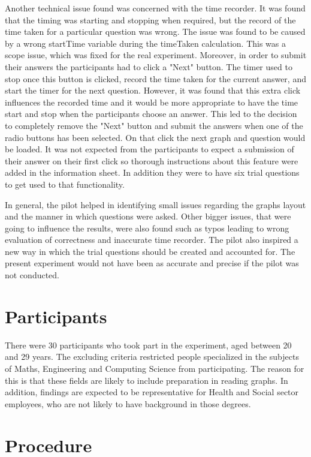 \documentclass{l4proj}
\begin{document}
Another technical issue found was concerned with the time recorder. It was found that the timing was starting and stopping when required, but the record of the time taken for a particular question was wrong. The issue was found to be caused by a wrong startTime variable during the timeTaken calculation. This was a scope issue, which was fixed for the real experiment. Moreover, in order to submit their answers the participants had to click a "Next" button. The timer used to stop once this button is clicked, record the time taken for the current answer, and start the timer for the next question. However, it was found that this extra click influences the recorded time and it would be more appropriate to have the time start and stop when the participants choose an answer. This led to the decision to completely remove the "Next" button and submit the answers when one of the radio buttons has been selected. On that click the next graph and question would be loaded. It was not expected from the participants to expect a submission of their answer on their first click so thorough instructions about this feature were added in the information sheet. In addition they were to have six trial questions to get used to that functionality. 
 
In general, the pilot helped in identifying small issues regarding the graphs layout and the manner in which questions were asked. Other bigger issues, that were going to influence the results, were also found such as typos leading to wrong evaluation of correctness and inaccurate time recorder. The pilot also inspired a new way in which the trial questions should be created and accounted for. The present experiment would not have been as accurate and precise if the pilot was not conducted.

\section{Participants}
There were 30 participants who took part in the experiment, aged between 20 and 29 years. The excluding criteria restricted people specialized in the subjects of Maths, Engineering and Computing Science from participating. The reason for this is that these fields are likely to include preparation in reading graphs. In addition, findings are expected to be representative for Health and Social sector employees, who are not likely to have background in those degrees.

\section{Procedure}
\end{document}
